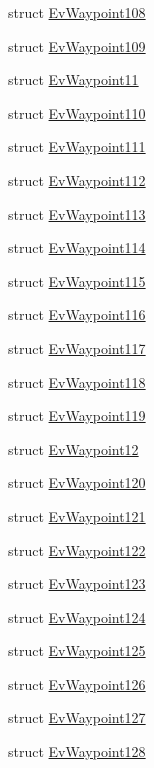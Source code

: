 \begin{DoxyCompactItemize}
\item 
struct \hyperlink{structsmacc_1_1EvWaypoint108}{Ev\+Waypoint108}
\item 
struct \hyperlink{structsmacc_1_1EvWaypoint109}{Ev\+Waypoint109}
\item 
struct \hyperlink{structsmacc_1_1EvWaypoint11}{Ev\+Waypoint11}
\item 
struct \hyperlink{structsmacc_1_1EvWaypoint110}{Ev\+Waypoint110}
\item 
struct \hyperlink{structsmacc_1_1EvWaypoint111}{Ev\+Waypoint111}
\item 
struct \hyperlink{structsmacc_1_1EvWaypoint112}{Ev\+Waypoint112}
\item 
struct \hyperlink{structsmacc_1_1EvWaypoint113}{Ev\+Waypoint113}
\item 
struct \hyperlink{structsmacc_1_1EvWaypoint114}{Ev\+Waypoint114}
\item 
struct \hyperlink{structsmacc_1_1EvWaypoint115}{Ev\+Waypoint115}
\item 
struct \hyperlink{structsmacc_1_1EvWaypoint116}{Ev\+Waypoint116}
\item 
struct \hyperlink{structsmacc_1_1EvWaypoint117}{Ev\+Waypoint117}
\item 
struct \hyperlink{structsmacc_1_1EvWaypoint118}{Ev\+Waypoint118}
\item 
struct \hyperlink{structsmacc_1_1EvWaypoint119}{Ev\+Waypoint119}
\item 
struct \hyperlink{structsmacc_1_1EvWaypoint12}{Ev\+Waypoint12}
\item 
struct \hyperlink{structsmacc_1_1EvWaypoint120}{Ev\+Waypoint120}
\item 
struct \hyperlink{structsmacc_1_1EvWaypoint121}{Ev\+Waypoint121}
\item 
struct \hyperlink{structsmacc_1_1EvWaypoint122}{Ev\+Waypoint122}
\item 
struct \hyperlink{structsmacc_1_1EvWaypoint123}{Ev\+Waypoint123}
\item 
struct \hyperlink{structsmacc_1_1EvWaypoint124}{Ev\+Waypoint124}
\item 
struct \hyperlink{structsmacc_1_1EvWaypoint125}{Ev\+Waypoint125}
\item 
struct \hyperlink{structsmacc_1_1EvWaypoint126}{Ev\+Waypoint126}
\item 
struct \hyperlink{structsmacc_1_1EvWaypoint127}{Ev\+Waypoint127}
\item 
struct \hyperlink{structsmacc_1_1EvWaypoint128}{Ev\+Waypoint128}
\item 

\end{DoxyCompactItemize}
